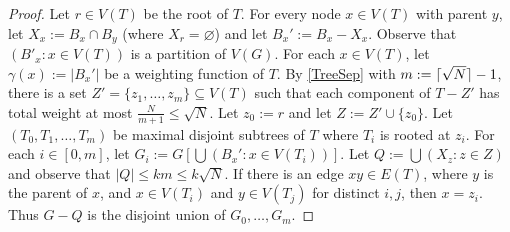\documentclass[12pt]{article}
\DeclarePairedDelimiter{\ceil}{\lceil}{\rceil}
\renewcommand{\emptyset}{\varnothing}
\renewcommand{\leq}{\leqslant}
\theoremstyle{plain}
\theoremstyle{definition}
\begin{document}
\begin{proof}
    Let $r\in V(T)$ be the root of $T$. For every node $x\in V(T)$ with parent $y$, let $X_x:=B_x\cap B_y$ (where $X_r=\emptyset$) and let $B_x':=B_x-X_x$. Observe that $({B}'_x \colon x \in V(T))$ is a partition of $V(G)$. For each $x\in V(T)$, let $\gamma(x):=|B_{x}'|$ be a weighting function of $T$. By \cref{TreeSep} with $m:=\ceil{\sqrt{N}}-1$, there is a set $Z'=\{z_1,\dots,z_{m}\}\subseteq V(T)$ such that each component of $T-Z'$ has total weight at most $\frac{N}{m+1}\leq \sqrt{N}$. Let $z_0:=r$ and let $Z:=Z'\cup \{z_0\}$. Let $(T_0,T_1,\dots,T_m)$ be maximal disjoint subtrees of $T$ where $T_i$ is rooted at $z_i$. For each $i\in [0,m]$, let $G_i:=G[\bigcup(B_x': x \in V(T_i))]$. Let $Q:= \bigcup (X_{z}: z \in Z)$ and observe that $|Q|\leq km \leq k\sqrt{N}$. If there is an edge $xy\in E(T)$, where $y$ is the parent of $x$, and $x\in V(T_i)$ and $y\in V(T_j)$ for distinct $i,j$, then $x=z_i$. Thus $G-Q$ is the disjoint union of $G_0,\dots,G_m$.


\end{proof}
\end{document}
